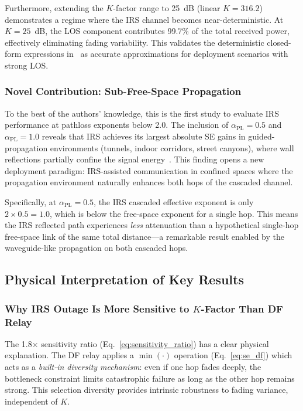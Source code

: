 \documentclass[journal]{IEEEtran} %
\begin{document}
Furthermore, extending the $K$-factor range to 25~dB (linear $K = 316.2$) demonstrates a regime where the IRS channel becomes near-deterministic. At $K = 25$~dB, the LOS component contributes 99.7\% of the total received power, effectively eliminating fading variability. This validates the deterministic closed-form expressions in~\cite{bjornson2020irs} as accurate approximations for deployment scenarios with strong LOS.

\subsubsection{Novel Contribution: Sub-Free-Space Propagation}

To the best of the authors' knowledge, this is the first study to evaluate IRS performance at pathloss exponents below 2.0. The inclusion of $\alpha_{\mathrm{PL}} = 0.5$ and $\alpha_{\mathrm{PL}} = 1.0$ reveals that IRS achieves its largest absolute SE gains in guided-propagation environments (tunnels, indoor corridors, street canyons), where wall reflections partially confine the signal energy~\cite{rappaport2015mmwave,molisch2006channel}. This finding opens a new deployment paradigm: IRS-assisted communication in confined spaces where the propagation environment naturally enhances both hops of the cascaded channel.

Specifically, at $\alpha_{\mathrm{PL}} = 0.5$, the IRS cascaded effective exponent is only $2 \times 0.5 = 1.0$, which is below the free-space exponent for a single hop. This means the IRS reflected path experiences \textit{less} attenuation than a hypothetical single-hop free-space link of the same total distance---a remarkable result enabled by the waveguide-like propagation on both cascaded hops.

\subsection{Physical Interpretation of Key Results}

\subsubsection{Why IRS Outage Is More Sensitive to $K$-Factor Than DF Relay}

The 1.8$\times$ sensitivity ratio (Eq.~\eqref{eq:sensitivity_ratio}) has a clear physical explanation. The DF relay applies a $\min(\cdot)$ operation (Eq.~\eqref{eq:se_df}) which acts as a \textit{built-in diversity mechanism}: even if one hop fades deeply, the bottleneck constraint limits catastrophic failure as long as the other hop remains strong. This selection diversity provides intrinsic robustness to fading variance, independent of $K$.
\end{document}

